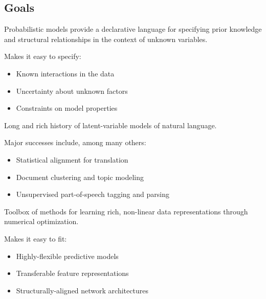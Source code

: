 
\subsection{Goals}

\begin{frame}{}
    Probabilistic models provide a declarative language for specifying 
    prior knowledge and structural relationships in the context of unknown variables.
    \vspace{0.5cm}
    \pause 
    
    Makes it easy to specify:
    \begin{itemize}
        \item Known interactions in the data
        \item Uncertainty about unknown factors
        \item Constraints on model properties
    \end{itemize}
\end{frame}

\begin{frame}{}
    Long and rich history of latent-variable models of natural language. 
    \vspace{0.5cm}
        
    Major successes include, among many others:
    \begin{itemize}
        \item Statistical alignment for translation \cite{} 
        \item Document clustering and topic modeling \cite{}  
        \item Unsupervised part-of-speech tagging and parsing \cite{}
    \end{itemize}
    \air 
    
\end{frame}


\begin{frame}{}
    Toolbox of methods for learning rich, non-linear 
    data representations through numerical optimization. 
    \vspace{0.5cm}
    
    \pause 
    Makes it easy to fit:
    \begin{itemize}
        \item Highly-flexible predictive models 
        \item Transferable feature representations 
        \item Structurally-aligned network architectures 
    \end{itemize}
    
\end{frame}

